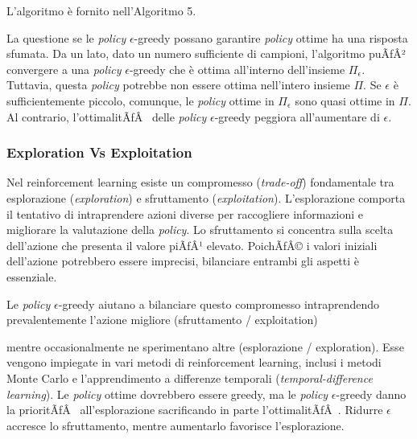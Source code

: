 ﻿\documentclass[11pt, a4paper]{report}
\begin{document}
L'algoritmo è fornito nell'Algoritmo 5.

La questione se le \emph{policy} $\epsilon$-greedy possano garantire \emph{policy} ottime ha una risposta sfumata. Da un lato, dato un numero sufficiente di campioni, l'algoritmo puÃƒÂ² convergere a una \emph{policy} $\epsilon$-greedy che è ottima all'interno dell'insieme $\Pi_\epsilon$. Tuttavia, questa \emph{policy} potrebbe non essere ottima nell'intero insieme $\Pi$. Se $\epsilon$ è sufficientemente piccolo, comunque, le \emph{policy} ottime in $\Pi_\epsilon$ sono quasi ottime in $\Pi$. Al contrario, l'ottimalitÃƒÂ  delle \emph{policy} $\epsilon$-greedy peggiora all'aumentare di $\epsilon$.

\subsubsection{Exploration Vs Exploitation}

Nel reinforcement learning esiste un compromesso (\emph{trade-off}) fondamentale tra esplorazione (\emph{exploration}) e sfruttamento (\emph{exploitation}). L'esplorazione comporta il tentativo di intraprendere azioni diverse per raccogliere informazioni e migliorare la valutazione della \emph{policy}. Lo sfruttamento si concentra sulla scelta dell'azione che presenta il valore piÃƒÂ¹ elevato. PoichÃƒÂ© i valori iniziali dell'azione potrebbero essere imprecisi, bilanciare entrambi gli aspetti è essenziale.

Le \emph{policy} $\epsilon$-greedy aiutano a bilanciare questo compromesso intraprendendo prevalentemente l'azione migliore (sfruttamento / exploitation)

\newpage

mentre occasionalmente ne sperimentano altre (esplorazione / exploration). Esse vengono impiegate in vari metodi di reinforcement learning, inclusi i metodi Monte Carlo e l'apprendimento a differenze temporali (\emph{temporal-difference learning}). Le \emph{policy} ottime dovrebbero essere greedy, ma le \emph{policy} $\epsilon$-greedy danno la prioritÃƒÂ  all'esplorazione sacrificando in parte l'ottimalitÃƒÂ . Ridurre $\epsilon$ accresce lo sfruttamento, mentre aumentarlo favorisce l'esplorazione.
\end{document}
